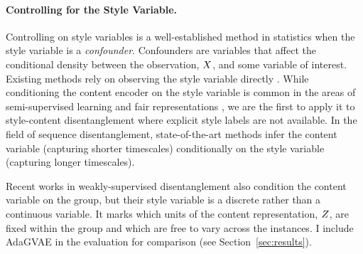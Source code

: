 \documentclass[../thesis.tex]{subfiles}
\begin{document}

\paragraph{Controlling for the Style Variable.} Controlling on style variables is a well-established method in statistics when the style variable is a \textit{confounder}. Confounders are variables that affect the conditional density between the observation, $\myrv{x}$, and some variable of interest. Existing methods rely on observing the style variable directly \citep{pearlCausalInferenceStatistics2016}. While conditioning the content encoder on the style variable is common in the areas of semi-supervised learning and fair representations \citep{kingma2014semi,louizos2016variational}, we are the first to apply it to style-content disentanglement where explicit style labels are not available. In the field of sequence disentanglement, state-of-the-art methods \citep{hsuUnsupervisedLearningDisentangled2017,denton2017unsupervised,liDisentangledSequentialAutoencoder2018} infer the content variable (capturing shorter timescales) conditionally on the style variable (capturing longer timescales). 

Recent works in weakly-supervised disentanglement \citep{shuWeaklySupervisedDisentanglement2019,locatelloChallengingCommonAssumptions2019,roederEfficientAmortisedBayesian2019} also condition the content variable on the group, but their style variable is a discrete rather than a continuous variable. It marks which units of the content representation, $\myrv{z}$, are fixed within the group and which are free to vary across the instances. I include AdaGVAE \citep{locatelloWeaklySupervisedDisentanglementCompromises2020} in the evaluation for comparison (see Section~\ref{sec:results}). 

\end{document}

